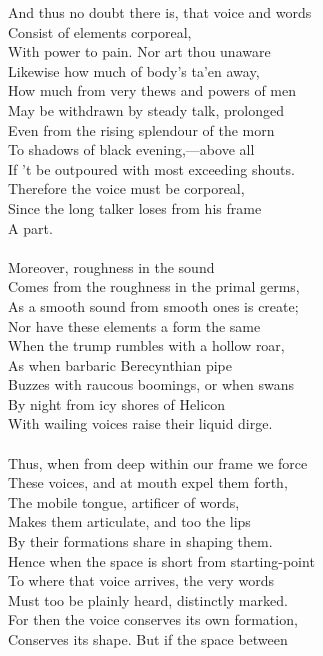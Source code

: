 And thus no doubt there is, that voice and words\\
Consist of elements corporeal,\\
With power to pain. Nor art thou unaware\\
Likewise how much of body's ta'en away,\\
How much from very thews and powers of men\\
May be withdrawn by steady talk, prolonged\\
Even from the rising splendour of the morn\\
To shadows of black evening,—above all\\
If 't be outpoured with most exceeding shouts.\\
Therefore the voice must be corporeal,\\
Since the long talker loses from his frame\\
A part.\\
\\
Moreover, roughness in the sound\\
Comes from the roughness in the primal germs,\\
As a smooth sound from smooth ones is create;\\
Nor have these elements a form the same\\
When the trump rumbles with a hollow roar,\\
As when barbaric Berecynthian pipe\\
Buzzes with raucous boomings, or when swans\\
By night from icy shores of Helicon\\
With wailing voices raise their liquid dirge.\\
\\
Thus, when from deep within our frame we force\\
These voices, and at mouth expel them forth,\\
The mobile tongue, artificer of words,\\
Makes them articulate, and too the lips\\
By their formations share in shaping them.\\
Hence when the space is short from starting-point\\
To where that voice arrives, the very words\\
Must too be plainly heard, distinctly marked.\\
For then the voice conserves its own formation,\\
Conserves its shape. But if the space between\\
